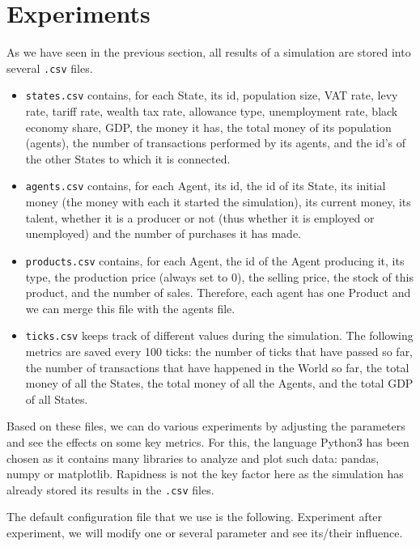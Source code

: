 \chapter{Experiments}

As we have seen in the previous section, all results of a simulation are stored into several \texttt{.csv} files.

\begin{itemize}
    \item \texttt{states.csv} contains, for each State, its id, population size, VAT rate, levy rate, tariff rate, wealth tax rate, allowance type, unemployment rate, black economy share, GDP, the money it has, the total money of its population (agents), the number of transactions performed by its agents, and the id's of the other States to which it is connected.

    \item \texttt{agents.csv} contains, for each Agent, its id, the id of its State, its initial money (the money with each it started the simulation), its current money, its talent, whether it is a producer or not (thus whether it is employed or unemployed) and the number of purchases it has made.
    
    \item \texttt{products.csv} contains, for each Agent, the id of the Agent producing it, its type, the production price (always set to 0), the selling price, the stock of this product, and the number of sales. Therefore, each agent has one Product and we can merge this file with the agents file.
    
    \item \texttt{ticks.csv} keeps track of different values during the simulation. The following metrics are saved every 100 ticks: the number of ticks that have passed so far, the number of transactions that have happened in the World so far, the total money of all the States, the total money of all the Agents, and the total GDP of all States.
\end{itemize}

Based on these files, we can do various experiments by adjusting the parameters and see the effects on some key metrics. For this, the language Python3 has been chosen as it contains many libraries to analyze and plot such data: pandas, numpy or matplotlib. Rapidness is not the key factor here as the simulation has already stored its results in the \texttt{.csv} files.

The default configuration file that we use is the following. Experiment after experiment, we will modify one or several parameter and see its/their influence. 

